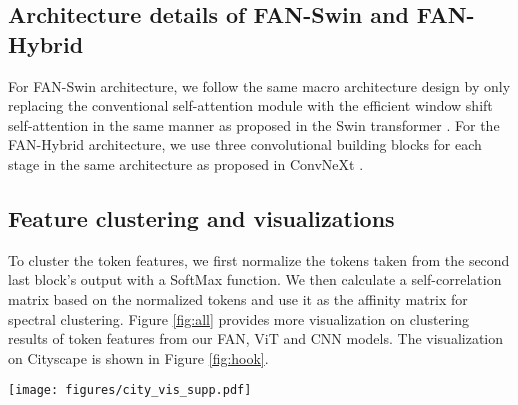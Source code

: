 \documentclass[nohyperref]{article}
\theoremstyle{plain}
\theoremstyle{definition}
\theoremstyle{remark}
\begin{document}
\vspace{-2mm}
\subsection{Architecture details of FAN-Swin and FAN-Hybrid}

For FAN-Swin architecture, we follow the same macro architecture design by only replacing the conventional self-attention module with the efficient window shift self-attention in the same manner as proposed in the Swin transformer \cite{liu2021swin}. For the FAN-Hybrid architecture, we use three convolutional building blocks for each stage in the same architecture as proposed in ConvNeXt \cite{liu2022convnet}.




\vspace{-2mm}
\subsection{Feature clustering and visualizations}
To cluster the token features, we first normalize the tokens taken from the second last block's output with a SoftMax function. We then calculate a self-correlation matrix based on the normalized tokens and use it as the affinity matrix for spectral clustering. Figure \ref{fig:all} provides more visualization on clustering results of token features from our FAN, ViT and CNN models. The visualization on Cityscape is shown in Figure \ref{fig:hook}.

\begin{figure*}[t] 
\centering
\texttt{[image: figures/city\_vis\_supp.pdf]}
\caption{\footnotesize Visualization on Cityscapes. A video demonstration is available with \href{https://drive.google.com/file/d/1A9Roe7SanJV145qh481nDpf5JAmiJ-Fl/view?usp=sharing}{external player}
}
\vspace{-3mm}
\label{fig:hook}
\end{figure*}
\end{document}
